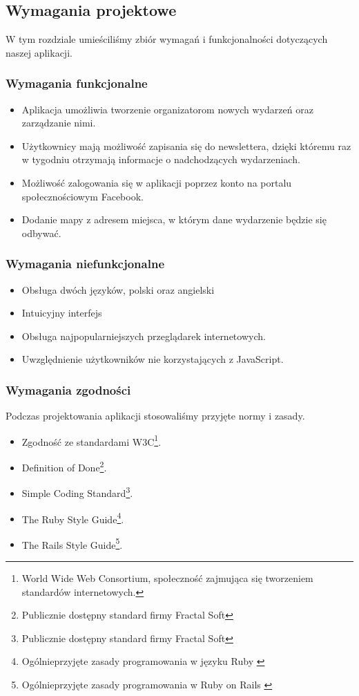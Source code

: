 

\subsection{Wymagania projektowe}
W tym rozdziale umieściliśmy zbiór wymagań i funkcjonalności dotyczących naszej aplikacji.
  \subsubsection{Wymagania funkcjonalne}
    \begin{itemize}
      \item Aplikacja umożliwia tworzenie organizatorom nowych wydarzeń oraz zarządzanie nimi.
      \item Użytkownicy mają możliwość zapisania się do newslettera, dzięki któremu raz w tygodniu otrzymają informacje o nadchodzących wydarzeniach.
      \item Możliwość zalogowania się w aplikacji poprzez konto na portalu społecznościowym Facebook.
      \item Dodanie mapy z adresem miejsca, w którym dane wydarzenie będzie się odbywać.
    \end{itemize}
  \subsubsection{Wymagania niefunkcjonalne}
    \begin{itemize}
      \item Obsługa dwóch języków, polski oraz angielski
      \item Intuicyjny interfejs
      \item Obsługa najpopularniejszych przeglądarek internetowych.
      \item Uwzględnienie użytkowników nie korzystających z JavaScript.
    \end{itemize}

  \subsubsection{Wymagania zgodności}
    Podczas projektowania aplikacji stosowaliśmy przyjęte normy i zasady.
    \begin{itemize}
      \item Zgodność ze standardami W3C\footnote{World Wide Web Consortium, społeczność zajmująca się tworzeniem standardów internetowych.}.
      \item Definition of Done\footnote{Publicznie dostępny standard firmy Fractal Soft\cite{dod}}.
      \item Simple Coding Standard\footnote{Publicznie dostępny standard firmy Fractal Soft\cite{scs}}.
      \item The Ruby Style Guide\footnote{Ogólnieprzyjęte zasady programowania w języku Ruby \cite{ruby_style_guide}}.
      \item The Rails Style Guide\footnote{Ogólnieprzyjęte zasady programowania w Ruby on Rails \cite{rails_style_guide}}.
    \end{itemize}
